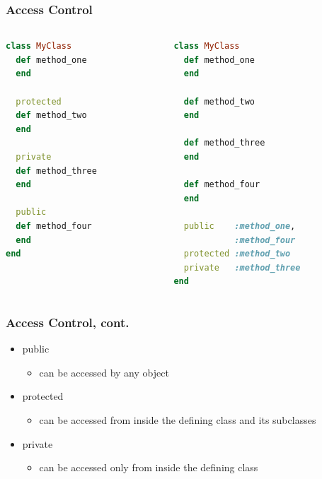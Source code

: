\begin{frame}[fragile]\frametitle{Access Control}

\begin{columns}[c] 

\begin{column}{5.2cm}
\begin{lstlisting}[language=ruby]
class MyClass
  def method_one
  end
  
  protected
  def method_two
  end
  
  private
  def method_three
  end
  
  public
  def method_four
  end
end
\end{lstlisting}
\end{column}
\pause
\begin{column}{5.4cm}
\begin{lstlisting}[language=ruby]
class MyClass
  def method_one
  end
  
  def method_two
  end
  
  def method_three
  end
  
  def method_four
  end
  
  public    :method_one, 
            :method_four
  protected :method_two
  private   :method_three
end
\end{lstlisting}
\end{column}

\end{columns}

\end{frame}



\begin{frame}[fragile]\frametitle{Access Control, cont.}

\begin{itemize}
\item public
\begin{itemize}
\item can be accessed by any object
\end{itemize}

\item protected
\begin{itemize}
\item can be accessed from inside the defining class and its subclasses
\end{itemize}

\item private
\begin{itemize}
\item can be accessed only from inside the defining class
\end{itemize}


\end{itemize}

\end{frame}






